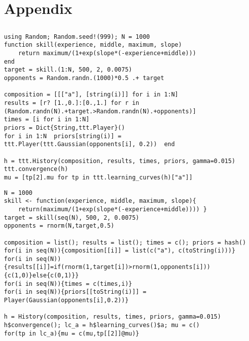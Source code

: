 \documentclass[article]{jss}
\newif\ifen
\newif\ifes
\newcommand{\en}[1]{\ifen#1\fi}
\newcommand{\es}[1]{\ifes#1\fi}
\begin{document}
\newpage
\section{Appendix} \label{app:technical}

\subsection{\en{Skill evolution}}\label{sec:appendix_skill_evolution}

\en{We attach the \proglang{Julia} and \proglang{R} codes that solve the example presented in the section \ref{sec:skill_evolution} about estimation the skill evolution of a new player.}
\es{Adjuntamos los códigos de \proglang{Julia} y \proglang{R} que resuelven el ejemplo presentado en la sección \ref{sec:skill_evolution} sobre la evolución de habilidad de un jugador nuevo.}
%
\begin{lstlisting}[backgroundcolor=\color{julia},caption={\en{\proglang{Julia} code}\es{Código \proglang{Julia}}},aboveskip=0.0 \baselineskip, belowskip=0.1cm]
using Random; Random.seed!(999); N = 1000
function skill(experience, middle, maximum, slope)
    return maximum/(1+exp(slope*(-experience+middle))) 
end
target = skill.(1:N, 500, 2, 0.0075)
opponents = Random.randn.(1000)*0.5 .+ target

composition = [[["a"], [string(i)]] for i in 1:N]
results = [r? [1.,0.]:[0.,1.] for r in (Random.randn(N).+target.>Random.randn(N).+opponents)]
times = [i for i in 1:N]
priors = Dict{String,ttt.Player}()
for i in 1:N  priors[string(i)] = ttt.Player(ttt.Gaussian(opponents[i], 0.2))  end

h = ttt.History(composition, results, times, priors, gamma=0.015)
ttt.convergence(h)
mu = [tp[2].mu for tp in ttt.learning_curves(h)["a"]]
\end{lstlisting}
%
\begin{lstlisting}[backgroundcolor=\color{r},caption={\en{\proglang{R} code}\es{Código \proglang{R}}},aboveskip=0.0 \baselineskip, belowskip=0.1cm]
N = 1000
skill <- function(experience, middle, maximum, slope){
    return(maximum/(1+exp(slope*(-experience+middle)))) }
target = skill(seq(N), 500, 2, 0.0075)
opponents = rnorm(N,target,0.5)

composition = list(); results = list(); times = c(); priors = hash()
for(i in seq(N)){composition[[i]] = list(c("a"), c(toString(i)))}
for(i in seq(N)){results[[i]]=if(rnorm(1,target[i])>rnorm(1,opponents[i])){c(1,0)}else{c(0,1)}}
for(i in seq(N)){times = c(times,i)}
for(i in seq(N)){priors[[toString(i)]] = Player(Gaussian(opponents[i],0.2))}
    
h = History(composition, results, times, priors, gamma=0.015)
h$convergence(); lc_a = h$learning_curves()$a; mu = c()
for(tp in lc_a){mu = c(mu,tp[[2]]@mu)}
\end{lstlisting}
\end{document}
